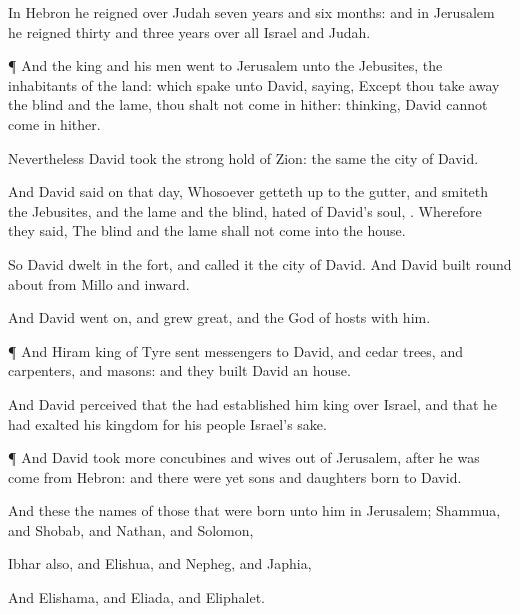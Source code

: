 {In
Hebron he
reigned over
Judah
seven
years and
six
months: and in
Jerusalem he
reigned
thirty and
three
years over all
Israel and
Judah.


\par }{\PP {}¶ And the
king and his
men
went to
Jerusalem unto the
Jebusites, the
inhabitants of the
land: which
spake unto
David,
saying, Except thou take
away the
blind and the
lame, thou shalt not come
in hither:
thinking,
David cannot come
in hither.

Nevertheless
David
took the strong
hold of
Zion: the same
{} the
city of
David.

And
David
said on that
day, Whosoever getteth
up to the
gutter, and
smiteth the
Jebusites, and the
lame and the
blind,
{}
hated of
David’s
soul,
{}. Wherefore they
said, The
blind and the
lame shall not
come into the
house.

So
David
dwelt in the
fort, and
called it the
city of
David. And
David
built round
about from
Millo and
inward.

And
David
went
on, and grew
great, and the
{}
God of
hosts
{} with him.


\par }{\PP {}¶ And
Hiram
king of
Tyre
sent
messengers to
David, and
cedar
trees, and
carpenters, and
masons: and they
built
David an
house.

And
David
perceived that the
{} had
established him
king over
Israel, and that he had
exalted his
kingdom for his
people
Israel’s sake.


\par }{\PP {}¶ And
David
took
{} more
concubines and
wives out of
Jerusalem,
after he was
come from
Hebron: and there were yet
sons and
daughters
born to
David.

And these
{} the
names of those that were
born unto him in
Jerusalem;
Shammua, and
Shobab, and
Nathan, and
Solomon,

Ibhar also, and
Elishua, and
Nepheg, and
Japhia,

And
Elishama, and
Eliada, and
Eliphalet.


}
